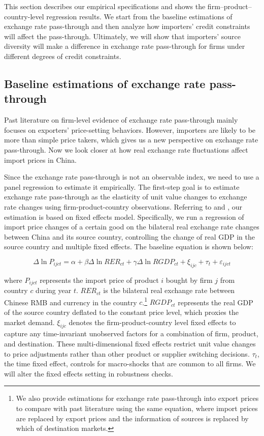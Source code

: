 This section describes our empirical specifications and shows the firm–product–country-level regression results. We start from the baseline estimations of exchange rate pass-through and then analyze how importers' credit constraints will affect the pass-through. Ultimately, we will show that importers' source diversity will make a difference in exchange rate pass-through for firms under different degrees of credit constraints.

\subsection{Baseline estimations of exchange rate pass-through} \label{Empirical-Baseline}

Past literature on firm-level evidence of exchange rate pass-through mainly focuses on exporters' price-setting behaviors. However, importers are likely to be more than simple price takers, which gives us a new perspective on exchange rate pass-through. Now we look closer at how real exchange rate fluctuations affect import prices in China.

Since the exchange rate pass-through is not an observable index, we need to use a panel regression to estimate it empirically. The first-step goal is to estimate exchange rate pass-through as the elasticity of unit value changes to exchange rate changes using firm-product-country observations. Referring to \cite{aik2014} and \cite{lmx2015}, our estimation is based on fixed effects model. Specifically, we run a regression of import price changes of a certain good on the bilateral real exchange rate changes between China and its source country, controlling the change of real GDP in the source country and multiple fixed effects. The baseline equation is shown below:

\begin{equation}
	\Delta \ln P_{i j c t}=\alpha+\beta \Delta \ln R E R_{c t}+\gamma \Delta \ln R G D P_{c t}+\xi_{i j c}+\tau_{t}+\varepsilon_{i j c t}
	\label{eq.baseline}
\end{equation}

where $P_{ijct}$ represents the import price of product $i$ bought by firm $j$ from country $c$ during year $t$. $R E R_{c t}$ is the bilateral real exchange rate between Chinese RMB and currency in the country $c$.\footnote{We also provide estimations for exchange rate pass-through into export prices to compare with past literature using the same equation, where import prices are replaced by export prices and the information of sources is replaced by which of destination markets.} $RGDP_{ct}$ represents the real GDP of the source country deflated to the constant price level, which proxies the market demand. $\xi_{ijc}$ denotes the firm-product-country level fixed effects to capture any time-invariant unobserved factors for a combination of firm, product, and destination. These multi-dimensional fixed effects restrict unit value changes to price adjustments rather than other product or supplier switching decisions. $\tau_t$, the time fixed effect, controls for macro-shocks that are common to all firms. We will alter the fixed effects setting in robustness checks.

